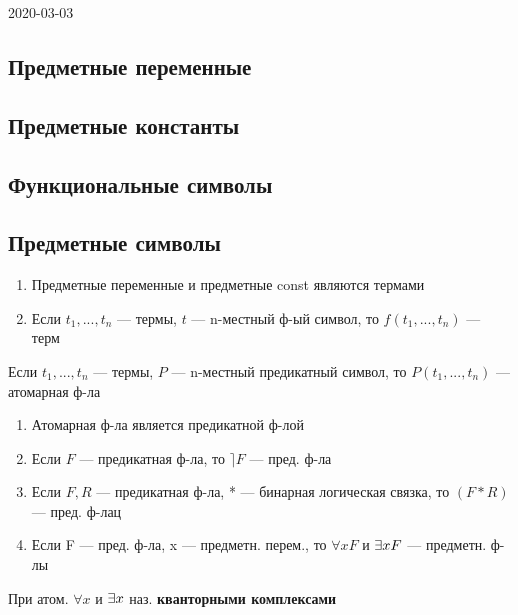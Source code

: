 \documentclass[main]{subfiles}
\begin{document}
\begin{lect} {2020-03-03}
    \subsection{Предметные переменные}
    \subsection{Предметные константы}
    \subsection{Функциональные символы}
    \subsection{Предметные символы}

    \begin{definition}[терм]
        \begin{enumerate}
            \item Предметные переменные и предметные const являются термами
            \item Если $t_1,...,t_n$ --- термы, $t$ --- n-местный ф-ый символ, то $f(t_1,...,t_n)$ --- терм
        \end{enumerate}
    \end{definition}

    \begin{definition}[атомарная ф-ла]
        Если $t_1,...,t_n$ --- термы, $P$ --- n-местный предикатный символ, то $P(t_1,...,t_n)$ --- атомарная ф-ла
    \end{definition}

    \begin{definition}[предикатная ф-ла]
        \begin{enumerate}
            \item Атомарная ф-ла является предикатной ф-лой
            \item Если $F$ --- предикатная ф-ла, то $\rceil F$ --- пред. ф-ла
            \item Если $F, R$ --- предикатная ф-ла, * --- бинарная логическая связка, то $(F*R)$ --- пред. ф-лац
            \item Если F --- пред. ф-ла, x --- предметн. перем., то $\forall x F$ и $\exists x F$ --- предметн. ф-лы
        \end{enumerate}

        При атом. $\forall x$ и $\exists x$ наз. {\bf кванторными комплексами}


\end{definition}
\end{lect}
\end{document}
